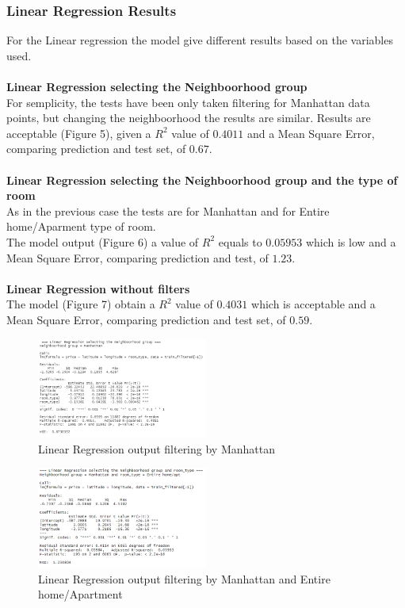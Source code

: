 \documentclass{FR16}
\begin{document}
\subsubsection{Linear Regression Results}
For the Linear regression the model give different results based on the variables used. \\\\
\textbf{Linear Regression selecting the Neighboorhood group}\\
For semplicity, the tests have been only taken filtering for Manhattan data points, but changing the neighboorhood the results are similar. 
Results are acceptable (Figure 5), given a $R^2$ value of $0.4011$ and a Mean Square Error, comparing prediction and test set, of $0.67$.
\\\\ \textbf{Linear Regression selecting the Neighboorhood group and the type of room}\\
As in the previous case the tests are for Manhattan and for Entire home/Aparment type of room.\\
The model output (Figure 6) a value of $R^2$ equals to $ 0.05953$ which is low  and a Mean Square Error, comparing prediction and test, of $1.23$.
\\\\ \textbf{Linear Regression without filters}\\
The model (Figure 7) obtain a $R^2$ value of $0.4031$ which is acceptable and a Mean Square Error, comparing prediction and test set, of $ 0.59$.
\begin{figure}[H]
\centering
\includegraphics[width=0.5\textwidth]{figures/lm2.PNG} 
\caption{\label{fig:6}  Linear Regression output filtering by  Manhattan}
\end{figure}
\begin{figure}[H]
\centering
\includegraphics[width=0.5\textwidth]{figures/lm3.PNG} 
\caption{\label{fig:7}  Linear Regression output filtering by  Manhattan and Entire home/Apartment }
\end{figure}
\end{document}

